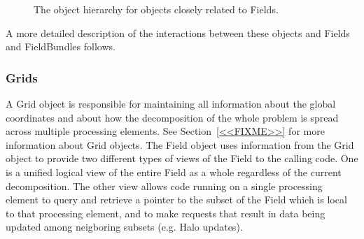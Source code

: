 \begin{figure}
\caption[Field hierarchy]{The object hierarchy for objects closely related to Fields.}
\label{fig:fieldhier}
\end{figure}


A more detailed description of the interactions between
these objects and Fields and FieldBundles follows.

\subsubsection{Grids}

A Grid object is responsible for
maintaining all information about the global coordinates and about how
the decomposition of the whole problem is spread across multiple
processing elements.  
See Section~\ref{<<FIXME>>} for more information about Grid objects.  
The Field object uses information from the Grid object to provide
two different types of views of the Field to the calling code.
One is a unified logical view of the entire Field as a whole
regardless of the current decomposition.  The other view allows code
running on a single processing element to query and retrieve a pointer 
to the subset of the Field which is local to that processing element,
and to make requests that result in data being updated among neigboring
subsets (e.g. Halo updates).

